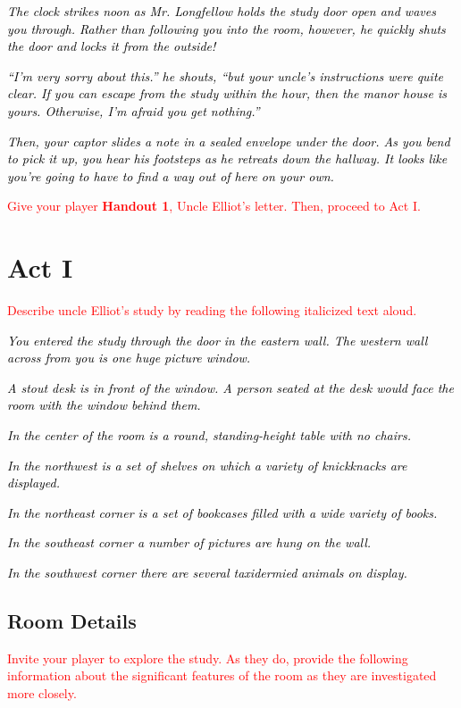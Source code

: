 \documentclass[a6paper, parskip=half, DIV=14, 12pt]{scrartcl}
\begin{document}
\textcolor{black}{\textit{The clock strikes noon as Mr. Longfellow holds the study door open and waves you through. Rather than following you into the room, however, he quickly shuts the door and locks it from the outside!}}

\textcolor{black}{\textit{``I'm very sorry about this.'' he shouts, ``but your uncle's instructions were quite clear. If you can escape from the study within the hour, then the manor house is yours. Otherwise, I'm afraid you get nothing.''}}

\textcolor{black}{\textit{Then, your captor slides a note in a sealed envelope under the door. As you bend to pick it up, you hear his footsteps as he retreats down the hallway. It looks like you're going to have to find a way out of here on your own.}}

\textcolor{Red}{Give your player \textbf{Handout 1}, Uncle Elliot's letter. Then, proceed to Act I.}

\newpage

\section*{Act I}
\textcolor{Red}{Describe uncle Elliot's study by reading the following italicized text aloud.}

\textcolor{black}{\textit{You entered the study through the door in the eastern wall. The western wall across from you is one huge picture window.}}

\textcolor{black}{\textit{A stout desk is in front of the window. A person seated at the desk would face the room with the window behind them.}}

\textcolor{black}{\textit{In the center of the room is a round, standing-height table with no chairs.}}

\textcolor{black}{\textit{In the northwest is a set of shelves on which a variety of knickknacks are displayed.}}

\textcolor{black}{\textit{In the northeast corner is a set of bookcases filled with a wide variety of books.}}

\textcolor{black}{\textit{In the southeast corner a number of pictures are hung on the wall.}}

\textcolor{black}{\textit{In the southwest corner there are several taxidermied animals on display.}}

\newpage

\subsection*{Room Details}
\textcolor{Red}{Invite your player to explore the study. As they do, provide the following information about the significant features of the room as they are investigated more closely.}
\end{document}
